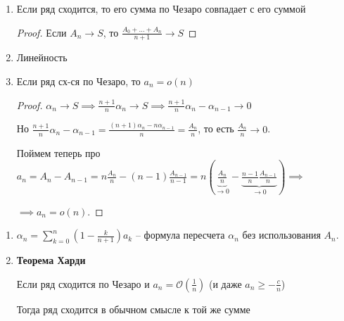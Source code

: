 \begin{properties}
    \begin{enumerate}
        \item {
            Если ряд сходится, то его сумма по Чезаро совпадает с его суммой

            \begin{proof}
                Если $A_n \rightarrow S$, то $\frac{A_0 + \ldots + A_n}{n + 1} \rightarrow S$
            \end{proof}
        }
        \item {
            Линейность
        }
        \item {
            Если ряд сх-ся по Чезаро, то $a_n = o(n)$



            \begin{proof}
                $\alpha_n \to S \implies \frac{n+1}{n} \alpha_n \to S \implies \frac{n + 1}{n} \alpha_n  - \alpha_{n - 1} \to 0$

                Но $\frac{n + 1}{n} \alpha_n  - \alpha_{n - 1} = \frac{(n+1) \alpha_n - n \alpha_{n- 1}}{n} = \frac{A_n}{n}$, то есть $\frac{A_n}{n} \to 0$.

                Поймем теперь про $a_n = A_n - A_{n - 1} = n \frac{A_n}{n} - (n - 1) \frac{A_{n - 1}}{n - 1} = n \left( \underbrace{\frac{A_n}{n}}_{\to 0} - \underbrace{\frac{n - 1}{n} \frac{A_{n - 1}}{n}}_{\to 0} \right) \implies$

                $\implies a_n = o(n)$.
            \end{proof}
        }
    \end{enumerate}
\end{properties}

\begin{remark}
    \begin{enumerate}
        \item {




            $\alpha_n = \sum\limits_{k=0}^{n} \left( 1 - \frac{k}{n + 1} \right) a_k$ -- формула пересчета $\alpha_n$ без использования $A_n$.
        }
        \item {
            \textbf{Теорема Харди}

            Если ряд сходится по Чезаро и $a_n = \mathcal{O} \left(\frac{1}{n} \right)$ (и даже $a_n \geqslant -\frac{c}{n}$)

            Тогда ряд сходится в обычном смысле к той же сумме
        }
    \end{enumerate}
\end{remark}

